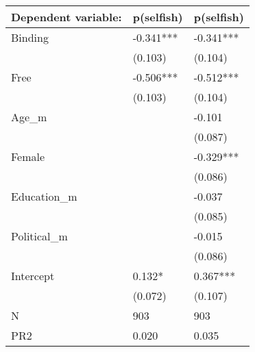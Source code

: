 \begin{tabular}{lll}
\toprule
Dependent variable: & p(selfish) & p(selfish) \\
\midrule
Binding     &  -0.341*** &  -0.341*** \\
            &    (0.103) &    (0.104) \\
Free        &  -0.506*** &  -0.512*** \\
            &    (0.103) &    (0.104) \\
Age\_m       &            &     -0.101 \\
            &            &    (0.087) \\
Female      &            &  -0.329*** \\
            &            &    (0.086) \\
Education\_m &            &     -0.037 \\
            &            &    (0.085) \\
Political\_m &            &     -0.015 \\
            &            &    (0.086) \\
Intercept   &     0.132* &   0.367*** \\
            &    (0.072) &    (0.107) \\
N           &        903 &        903 \\
PR2         &      0.020 &      0.035 \\
\bottomrule
\end{tabular}
